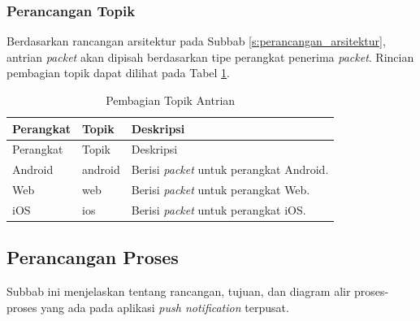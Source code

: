 \subsubsection{Perancangan Topik}
\par Berdasarkan rancangan arsitektur pada Subbab \ref{s:perancangan_arsitektur}, antrian \textit{packet} akan dipisah berdasarkan tipe perangkat penerima \textit{packet}. Rincian pembagian topik dapat dilihat pada Tabel \ref{t:pembagian_topik_antrian}.
\begin{longtable}{|p{2cm}|p{2cm}|p{5cm}|}
	\caption{Pembagian Topik Antrian} \label{t:pembagian_topik_antrian} \\ \hline
	\rowcolor{lightgray} Perangkat & Topik & Deskripsi \\ \hline
	\endfirsthead
	\hline
	\rowcolor{lightgray} Perangkat & Topik & Deskripsi \\ \hline
	\endhead
	Android & android & Berisi \textit{packet} untuk perangkat Android. \\ \hline
	Web & web & Berisi \textit{packet} untuk perangkat Web. \\ \hline
	iOS & ios & Berisi \textit{packet} untuk perangkat iOS. \\ \hline
\end{longtable}

\subsection{Perancangan Proses}
\par Subbab ini menjelaskan tentang rancangan, tujuan, dan diagram alir proses-proses yang ada pada aplikasi \textit{push notification} terpusat.

\clearpage

